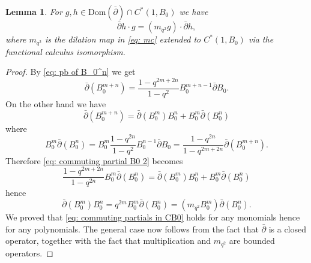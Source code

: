\documentclass[12pt]{article}
\newtheorem{lemma}[definition]{Lemma}
\numberwithin{equation}{section}
\def\Dom{{\mathrm {Dom}}}
\def\pb{\bar{\partial}}
\begin{document}
\begin{lemma} \label{lemma: commuting partials in CB0}
    For $g, h \in \Dom(\pb)\cap C^*(1, B_0)$ we have  
    \begin{equation}\label{eq: commuting partials in CB0}
    \pb h \cdot g = (m_{q^2}g) \cdot \pb h,
    \end{equation}
    where $m_{q^2}$ is the dilation map in \eqref{eq: mc} extended to $C^*(1, B_0)$ via the functional calculus isomorphism.
\end{lemma}
\begin{proof}
   By \eqref{eq: pb of B_0^n} we get
   \begin{equation}\label{eq: commuting partial B0 1}
       \pb(B_0^{m+n})=\frac{1-q^{2m+2n}}{1-q^2}B_0^{m+n-1}\pb B_0.
   \end{equation}
   On the other hand we have
     \begin{equation}\label{eq: commuting partial B0 2}\pb(B_0^{m+n})=\pb(B_0^m)B_0^n+B_0^m\pb(B_0^n)\end{equation}
   where 
   $$
   B_0^m\pb(B_0^n)=B_0^m\frac{1-q^{2n}}{1-q^2}B_0^{n-1}\pb B_0=\frac{1-q^{2n}}{1-q^{2m+2n}}\pb(B_0^{m+n}).
   $$
   Therefore \eqref{eq: commuting partial B0 2} becomes
    $$ 
      \frac{1-q^{2m+2n}}{1-q^{2n}}B_0^m\pb(B_0^n)=\pb(B_0^m)B_0^n+B_0^m\pb(B_0^n)
 $$  
   hence
       \begin{equation}\label{eq: commuting partial B0 3}
    \pb(B_0^m)B_0^n=q^{2m}B_0^m\pb(B_0^n)=(m_{q^2}B_0^m)\pb(B_0^n).
   \end{equation}
   We proved that \eqref{eq: commuting partials in CB0} holds for any monomials hence for any polynomials. The general case now follows from the fact that $\pb$ is a closed operator, together with the fact that multiplication and $m_{q^2}$ are bounded operators.
\end{proof}
\end{document}
